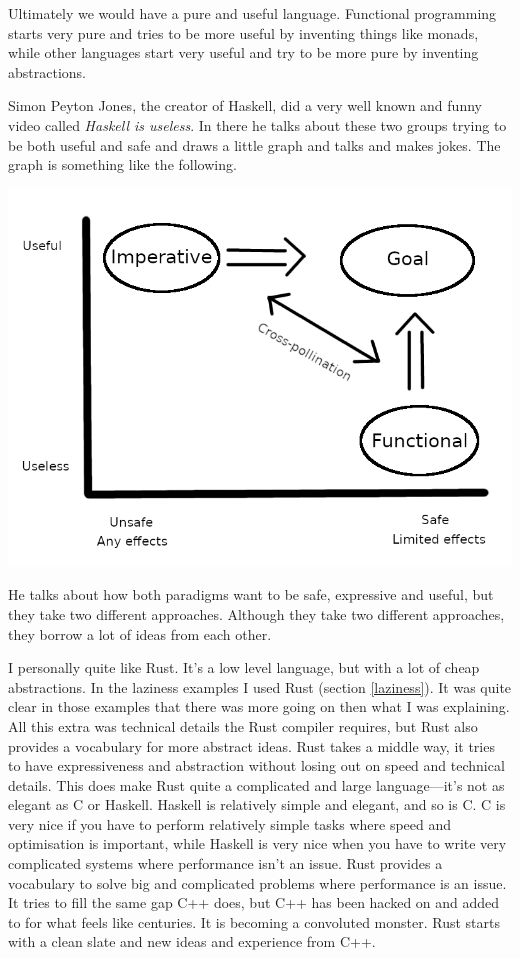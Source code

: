 \documentclass[11pt]{article}
\begin{document}
Ultimately we would have a pure and useful language. Functional programming
starts very pure and tries to be more useful by inventing things like monads,
while other languages start very useful and try to be more pure by inventing
abstractions.

Simon Peyton Jones, the creator of Haskell, did a very well known and funny
video called \emph{Haskell is useless}. In there he talks about these two
groups trying to be both useful and safe and draws a little graph and talks and
makes jokes. The graph is something like the following.


\begin{center}
	\includegraphics[scale=1.3]{useless}
\end{center}

He talks about how both paradigms want to be safe, expressive and useful, but
they take two different approaches. Although they take two different
approaches, they borrow a lot of ideas from each other.

I personally quite like Rust. It's a low level language, but with a lot of
cheap abstractions. In the laziness examples I used Rust (section
\ref{laziness}). It was quite clear in those examples that there was more going
on then what I was explaining. All this extra was technical details the Rust
compiler requires, but Rust also provides a vocabulary for more abstract ideas.
Rust takes a middle way, it tries to have expressiveness and abstraction
without losing out on speed and technical details. This does make Rust quite a
complicated and large language---it's not as elegant as C or Haskell. Haskell
is relatively simple and elegant, and so is C. C is very nice if you have to
perform relatively simple tasks where speed and optimisation is important,
while Haskell is very nice when you have to write very complicated systems
where performance isn't an issue. Rust provides a vocabulary to solve big and
complicated problems where performance is an issue. It tries to fill the same
gap C++ does, but C++ has been hacked on and added to for what feels like
centuries. It is becoming a convoluted monster. Rust starts with a clean slate
and new ideas and experience from C++.
\end{document}
